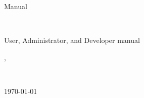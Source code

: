 \begin{titlepage}
\begin{center}
  \qpy{} Manual
\end{center}\vspace{3.0cm}

\begin{center}
\begin{minipage}{0.9\textwidth}
\begin{center}
  {\Huge \qpy{}} \, \textsf{\Large\qpyFull{}}\\[0.5cm]
\end{center}
\end{minipage}
\end{center}

\begin{center}
{\large User, Administrator, and Developer manual}
\end{center}

\qpyVersion{}, \qpyYear{}\\[3.0cm]

\begin{flushleft}
\qpyAuthor{}\\\vspace{1.0cm}

\qpyContrib{}
\end{flushleft}

\vfill
\begin{center}
{\large \today}
\end{center}

\end{titlepage}

